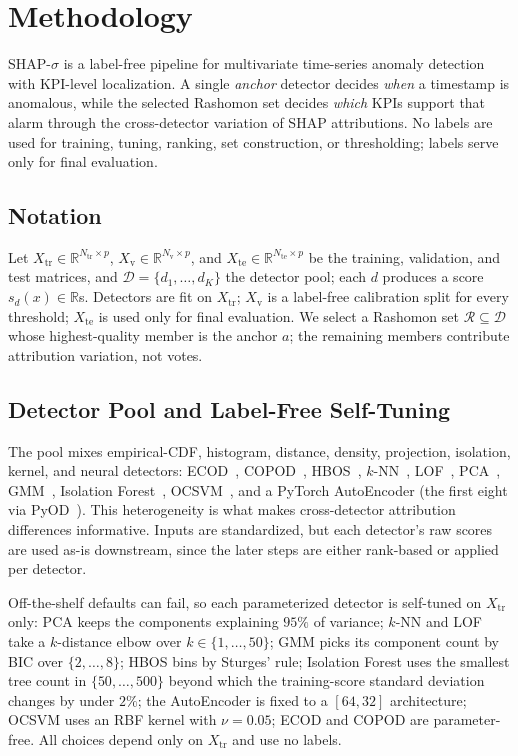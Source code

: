 \documentclass[conference]{IEEEtran}
\begin{document}
\section{Methodology}
\label{sec:method}

SHAP-$\sigma$ is a label-free pipeline for multivariate time-series
anomaly detection with KPI-level localization. A single \emph{anchor}
detector decides \emph{when} a timestamp is anomalous, while the selected
Rashomon set decides \emph{which} KPIs support that alarm through the
cross-detector variation of SHAP attributions. No labels are used for
training, tuning, ranking, set construction, or thresholding; labels
serve only for final evaluation.

\subsection{Notation}
Let $X_{\mathrm{tr}}\!\in\!\mathbb{R}^{N_{\mathrm{tr}}\times p}$,
$X_{\mathrm{v}}\!\in\!\mathbb{R}^{N_{\mathrm{v}}\times p}$, and
$X_{\mathrm{te}}\!\in\!\mathbb{R}^{N_{\mathrm{te}}\times p}$ be the
training, validation, and test matrices, and
$\mathcal{D}=\{d_1,\dots,d_K\}$  the detector pool; each $d$
produces a score $s_d(x)\in\mathbb{R}$s.
Detectors are fit on $X_{\mathrm{tr}}$; $X_{\mathrm{v}}$ is a label-free
calibration split for every threshold; $X_{\mathrm{te}}$ is used only for final
evaluation. We select a Rashomon set $\mathcal{R}\subseteq\mathcal{D}$
whose highest-quality member is the anchor $a$; the remaining members
contribute attribution variation, not votes.

\subsection{Detector Pool and Label-Free Self-Tuning}
\label{sec:pool}\label{sec:tuning}
The pool mixes empirical-CDF, histogram, distance, density, projection,
isolation, kernel, and neural detectors: ECOD~\cite{Li2022ECOD},
COPOD~\cite{Li2020COPOD}, HBOS~\cite{Goldstein2012},
$k$-NN~\cite{Ramaswamy2000}, LOF~\cite{Breunig2000}, PCA~\cite{Shyu2003},
GMM~\cite{AggarwalSathe2017}, Isolation Forest~\cite{Liu2008},
OCSVM~\cite{Scholkopf2001}, and a PyTorch AutoEncoder (the first eight via
PyOD~\cite{Zhao2019}). This heterogeneity is what makes cross-detector
attribution differences informative. Inputs are standardized, but each
detector's raw scores are used as-is downstream, since the later steps are
either rank-based or applied per detector.

Off-the-shelf defaults can fail,
so each parameterized detector is self-tuned on $X_{\mathrm{tr}}$ only:
PCA keeps the components explaining $95\%$ of variance; $k$-NN and LOF take
a $k$-distance elbow over $k\in\{1,\dots,50\}$; GMM picks its component
count by BIC over $\{2,\dots,8\}$; HBOS bins by Sturges' rule; Isolation
Forest uses the smallest tree count in $\{50,\dots,500\}$ beyond which the
training-score standard deviation changes by under $2\%$; the AutoEncoder
is fixed to a $[64,32]$ architecture; OCSVM
uses an RBF kernel with $\nu{=}0.05$; ECOD and COPOD are parameter-free.
All choices depend only on $X_{\mathrm{tr}}$ and use no labels.
\end{document}
